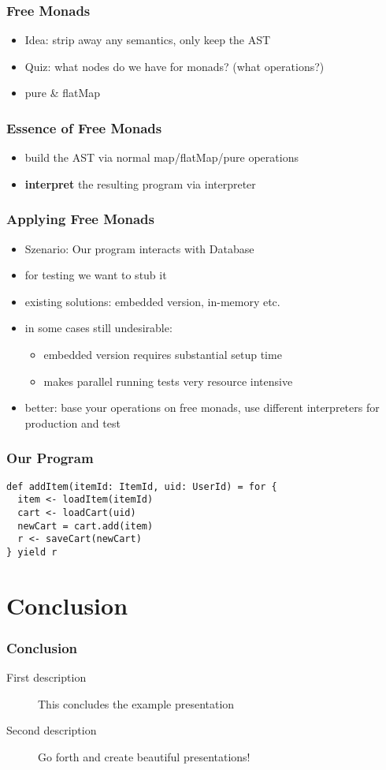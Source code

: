 \documentclass{beamer}
\begin{document}
\begin{frame}
  \frametitle{Free Monads}
  \begin{itemize}
  \item<1> Idea: strip away any semantics, only keep the AST
  \item<1> Quiz: what nodes do we have for monads? (what operations?)
  \item<2> pure \& flatMap
  \end{itemize}
\end{frame}

\begin{frame}
  \frametitle{Essence of Free Monads}
  \begin{itemize}
  \item build the AST via normal map/flatMap/pure operations
  \item \textbf{interpret} the resulting program via interpreter
  \end{itemize}
\end{frame}

\begin{frame}
  \frametitle{Applying Free Monads}
  \begin{itemize}
  \item Szenario: Our program interacts with Database
  \item<1> for testing we want to stub it
  \item<1> existing solutions: embedded version, in-memory etc.
  \item<2> in some cases still undesirable:
    \begin{itemize}
    \item embedded version requires substantial setup time
    \item makes parallel running tests very resource intensive
    \end{itemize}
  \item<2> better: base your operations on free monads, use different
    interpreters for production and test
  \end{itemize}
\end{frame}

\begin{frame}[fragile]
  \frametitle{Our Program}
\begin{verbatim}
def addItem(itemId: ItemId, uid: UserId) = for {
  item <- loadItem(itemId)
  cart <- loadCart(uid)
  newCart = cart.add(item)
  r <- saveCart(newCart)
} yield r
\end{verbatim}
\end{frame}

\section{Conclusion}

\begin{frame}
  \frametitle{Conclusion}
  \begin{description}
  \item[First description] This concludes the example presentation
  \item[Second description] Go forth and create beautiful presentations!
  \end{description}
\end{frame}
\end{document}

